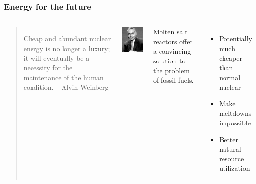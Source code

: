\begin{frame}
    \frametitle{Energy for the future}
        \begin{columns}
            \column[t]{5cm}

            \begin{quote}
                    Cheap and abundant nuclear energy is no longer a luxury; it will eventually be a necessity for the maintenance of the human condition. -- Alvin Weinberg
            \end{quote}


            \begin{center}
                    \includegraphics[height=0.3\textheight]{weinberg}
            \end{center}
            \column[t]{5cm}

            Molten salt reactors offer a convincing solution to the problem of fossil fuels.

            \begin{itemize}
                \item{Potentially much cheaper than normal nuclear}
                \item{Make meltdowns impossible}
                \item{Better natural resource utilization}
            \end{itemize}

        \end{columns}
\end{frame}

